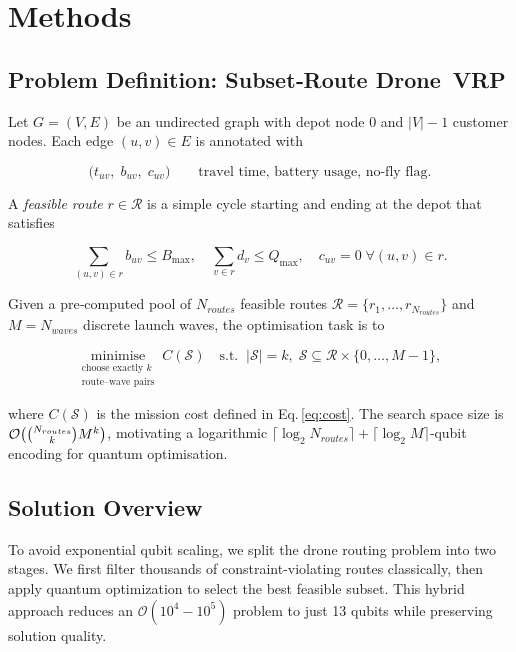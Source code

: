 
\section{Methods}
\label{sec:methods}

\subsection{Problem Definition: Subset‑Route Drone VRP}
\label{sec:problem}

Let $G=(V,E)$ be an undirected graph with depot node $0$ and
$|V|-1$ customer nodes.  Each edge $(u,v)\in E$ is annotated with

\[
\bigl(t_{uv}, \; b_{uv}, \; c_{uv}\bigr)
\qquad
\text{travel time, battery usage, no‑fly flag.}
\]

A \emph{feasible route} $r\in\mathcal{R}$ is a simple cycle starting and
ending at the depot that satisfies

\[
\textstyle
\sum_{(u,v)\in r} b_{uv} \le B_{\max},
\quad
\sum_{v\in r} d_v \le Q_{\max},
\quad
c_{uv}=0 \;\forall(u,v)\in r.
\]

Given a pre‑computed pool of $N_{routes}$ feasible routes
$\mathcal{R}=\{r_1,\dots,r_{N_{routes}}\}$ and $M=N_{waves}$ discrete launch
waves, the optimisation task is to

\[
\underset{
    \substack{\text{choose exactly }k\\ \text{route–wave pairs}}}
    {\text{minimise}}
\; C(\mathcal{S})
\quad
\text{s.t.}
\;\;
|\mathcal{S}|=k,\;
\mathcal{S}\subseteq\mathcal{R}\times\{0,\dots,M-1\},
\]

where $C(\mathcal{S})$ is the mission cost defined in
Eq.\,\eqref{eq:cost}.  The search space size is
$\mathcal{O}\big({\small\binom{N_{routes}}{k} M^{k}}\big)$, motivating a logarithmic
$\lceil\log_2 N_{routes}\rceil+\lceil\log_2 M\rceil$‑qubit encoding for
quantum optimisation.

\subsection{Solution Overview}

To avoid exponential qubit scaling, we split the drone routing problem into two stages. We first filter thousands of constraint-violating routes classically, then apply quantum optimization to select the best feasible subset. This hybrid approach reduces an $\mathcal{O}(10^4 - 10^5)$ problem to just 13 qubits while preserving solution quality.

